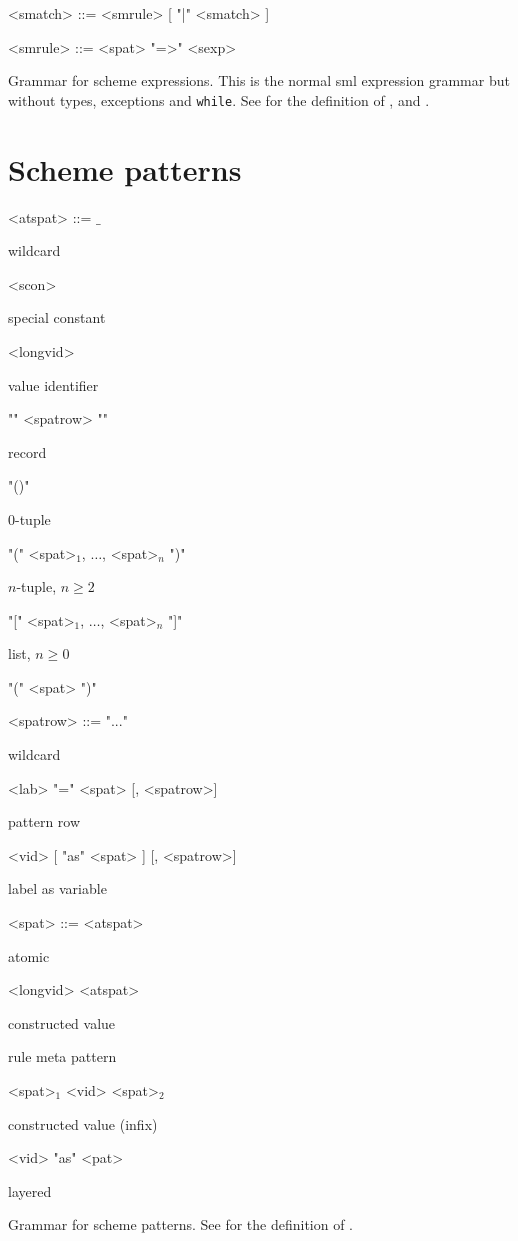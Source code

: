 \begin{nonfloatingtable}
\begin{grammar}
  <smatch> ::= <smrule> [ "|" <smatch> ]
  
  <smrule> ::= <spat> "=>" <sexp>
\end{grammar}

  \caption{Grammar for scheme expressions. This is the normal sml expression
    grammar but without types, exceptions and \texttt{while}.  See  for
    the definition of ,  and .}
  \label{tab:scheme-expressions}
\end{nonfloatingtable}

\clearpage

\section{Scheme patterns}

\begin{nonfloatingtable}

\setlength{\grammarindent}{7em}

\newcommand{\cmt}[1]{\parbox{8em}{\small{#1}}}

\begin{grammar}
  <atspat> ::= $\_$                              \hfill \cmt{wildcard}
  \alt <scon>                                    \hfill \cmt{special constant}
  \alt ["op"] <longvid>                          \hfill \cmt{value identifier}
  \alt "{" <spatrow> "}"                         \hfill \cmt{record}
  \alt "()"                                      \hfill \cmt{$0$-tuple}
  \alt "(" <spat>$_1$, $\ldots$, <spat>$_n$ ")"  \hfill \cmt{$n$-tuple, $n \geq  2$}
  \alt "[" <spat>$_1$, $\ldots$, <spat>$_n$ "]"  \hfill \cmt{list, $n \geq 0$}
  \alt "(" <spat> ")" 

  <spatrow> ::= "..."                      \hfill \cmt{wildcard}
  \alt <lab> "=" <spat> [, <spatrow>]      \hfill \cmt{pattern row}
  \alt <vid> [ "as" <spat> ] [, <spatrow>] \hfill \cmt{label as variable}

  <spat> ::= <atspat>                      \hfill \cmt{atomic}
  \alt ["op"] <longvid> <atspat>           \hfill \cmt{constructed value}
                   \hfill \cmt{rule meta pattern}
  \alt <spat>$_1$ <vid> <spat>$_2$         \hfill \cmt{constructed value (infix)}
  \alt ["op"] <vid> "as" <pat>             \hfill \cmt{layered}
\end{grammar}
  
  \caption{Grammar for scheme patterns. See  for
    the definition of .}
  \label{tab:scheme-patterns}
\end{nonfloatingtable}

